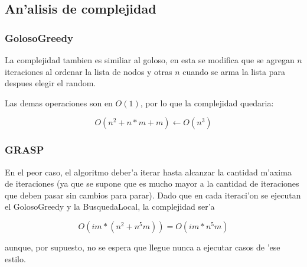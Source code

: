 \subsection{An'alisis de complejidad}
\subsubsection{GolosoGreedy}
La complejidad tambien es similiar al goloso, en esta se modifica que se agregan $n$ iteraciones al ordenar la lista de nodos y otras $n$ cuando se arma la lista para despues elegir el random.

Las demas operaciones son en $O(1)$, por lo que la complejidad quedaria: 

$$O(n^{2}+n*m+m) \leftarrow O(n^3)$$


\subsubsection{GRASP}
En el peor caso, el algoritmo deber'a iterar hasta alcanzar la cantidad m'axima de iteraciones (ya que se supone que es mucho mayor a la cantidad de iteraciones que deben pasar sin cambios para parar). Dado que en cada iteraci'on se ejecutan el GolosoGreedy y la BusquedaLocal, la complejidad ser'a 

$$O(im * (n^2 + n^5m)) = O(im * n^5m)$$

aunque, por supuesto, no se espera que llegue nunca a ejecutar casos de 'ese estilo.

